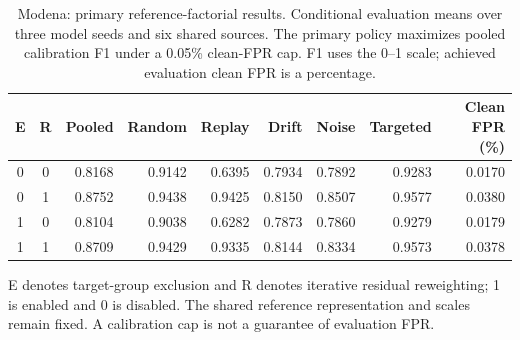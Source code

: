 \begin{table}[tbp]
\centering\small
\setlength{\tabcolsep}{4pt}
\renewcommand{\arraystretch}{1.1}
\caption[Modena: primary reference-factorial results]{Modena: primary reference-factorial results. Conditional evaluation means over three model seeds and six shared sources. The primary policy maximizes pooled calibration F1 under a 0.05\% clean-FPR cap. F1 uses the 0--1 scale; achieved evaluation clean FPR is a percentage.}
\label{tab:factorial_primary_modena}
\begin{tabular}{@{}ccrrrrrrr@{}}
\toprule
E & R & Pooled & Random & Replay & Drift & Noise & Targeted & \shortstack{Clean FPR\\(\%)} \\
\midrule
0 & 0 & 0.8168 & 0.9142 & 0.6395 & 0.7934 & 0.7892 & 0.9283 & 0.0170 \\
0 & 1 & 0.8752 & 0.9438 & 0.9425 & 0.8150 & 0.8507 & 0.9577 & 0.0380 \\
1 & 0 & 0.8104 & 0.9038 & 0.6282 & 0.7873 & 0.7860 & 0.9279 & 0.0179 \\
1 & 1 & 0.8709 & 0.9429 & 0.9335 & 0.8144 & 0.8334 & 0.9573 & 0.0378 \\
\bottomrule
\end{tabular}
\par\smallskip
\begin{minipage}{\linewidth}\footnotesize E denotes target-group exclusion and R denotes iterative residual reweighting; 1 is enabled and 0 is disabled. The shared reference representation and scales remain fixed. A calibration cap is not a guarantee of evaluation FPR.\end{minipage}
\end{table}
